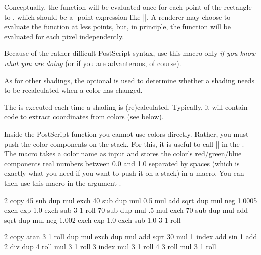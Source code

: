 \begin{command}{\pgfdeclarefunctionalshading{}}
  Conceptually, the function will be evaluated once for each point of
  the rectangle  to ,
  which should be a \pgfname-point expression like
  |\pgfpoint{100bp}{100bp}|. A renderer may choose to evaluate the
  function at less points, but, in principle, the function will be
  evaluated for each pixel independently. 

  Because of the rather difficult PostScript syntax, use this macro
  only \emph{if you know what you are doing} (or if you are
  advanterous, of course). 

  As for other shadings, the optional  is used to
  determine whether a shading needs to be recalculated when a color
  has changed.

  The  is executed each time a shading is
  (re)calculated. Typically, it will contain code to extract
  coordinates from colors (see below).

  Inside the PostScript function  you cannot use
  colors directly. Rather, you must push the color components on the
  stack. For this, it is useful to call |\pgfshadecolorrgb| in the
  . The macro takes a color name as input and stores
  the color's red/green/blue components real numbers between 0.0 and
  1.0 separated by spaces (which is exactly what you need if you want
  to push it on a stack) in a macro. You can then use this macro in
  the argument .

\begin{codeexample}[]
    {\pgfpointorigin}{\pgfpoint{4cm}{4cm}}{}{
  2 copy
  45 sub dup mul exch
  40 sub dup mul 0.5 mul add sqrt
  dup mul neg 1.0005 exch exp 1.0 exch sub
  3 1 roll
  70 sub dup mul .5 mul exch
  70 sub dup mul add sqrt
  dup mul neg 1.002 exch exp 1.0 exch sub
  1.0 3 1 roll
}
\end{codeexample}

\begin{codeexample}[]
{\pgfpoint{1cm}{1cm}}{}{
  2 copy        %
  atan
  3 1 roll
  dup mul exch
  dup mul add sqrt
  30 mul
  1 index add
  sin
  1 add 2 div  
  dup
   4 roll      %
  mul
  3 1 roll
  3 index
  mul
  3 1 roll
  4 3 roll
  mul
  3 1 roll
}
%
%
%
\end{codeexample}
\end{command}


